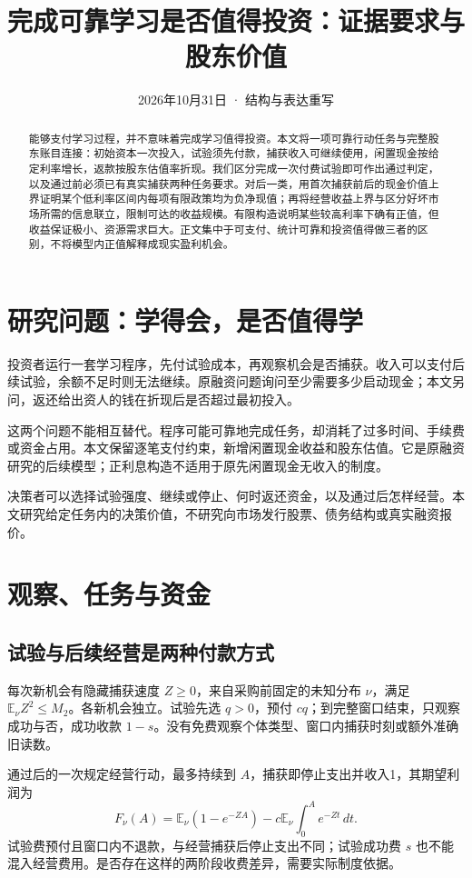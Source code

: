\documentclass[UTF8,fontset=windows,11pt,a4paper]{ctexart}
\numberwithin{equation}{section}
\begin{document}
\title{完成可靠学习是否值得投资：证据要求与股东价值}
\author{}\date{2026年10月31日 · 结构与表达重写}
\maketitle
\begin{abstract}
能够支付学习过程，并不意味着完成学习值得投资。本文将一项可靠行动任务与完整股东账目连接：初始资本一次投入，试验须先付款，捕获收入可继续使用，闲置现金按给定利率增长，返款按股东估值率折现。我们区分完成一次付费试验即可作出通过判定，以及通过前必须已有真实捕获两种任务要求。对后一类，用首次捕获前后的现金价值上界证明某个低利率区间内每项有限政策均为负净现值；再将经营收益上界与区分好坏市场所需的信息联立，限制可达的收益规模。有限构造说明某些较高利率下确有正值，但收益保证极小、资源需求巨大。正文集中于可支付、统计可靠和投资值得做三者的区别，不将模型内正值解释成现实盈利机会。
\end{abstract}

\section{研究问题：学得会，是否值得学}
投资者运行一套学习程序，先付试验成本，再观察机会是否捕获。收入可以支付后续试验，余额不足时则无法继续。原融资问题询问至少需要多少启动现金；本文另问，返还给出资人的钱在折现后是否超过最初投入。

这两个问题不能相互替代。程序可能可靠地完成任务，却消耗了过多时间、手续费或资金占用。本文保留逐笔支付约束，新增闲置现金收益和股东估值。它是原融资研究的后续模型；正利息构造不适用于原先闲置现金无收入的制度。

决策者可以选择试验强度、继续或停止、何时返还资金，以及通过后怎样经营。本文研究给定任务内的决策价值，不研究向市场发行股票、债务结构或真实融资报价。

\section{观察、任务与资金}
\subsection{试验与后续经营是两种付款方式}
每次新机会有隐藏捕获速度 $Z\ge0$，来自采购前固定的未知分布 $\nu$，满足 $\mathbb E_\nu Z^2\le M_2$。各新机会独立。试验先选 $q>0$，预付 $cq$；到完整窗口结束，只观察成功与否，成功收款 $1-s$。没有免费观察个体类型、窗口内捕获时刻或额外准确旧读数。

通过后的一次规定经营行动，最多持续到 $A$，捕获即停止支出并收入1，其期望利润为
\begin{equation}
 F_\nu(A)=\mathbb E_\nu(1-e^{-ZA})
 -c\mathbb E_\nu\int_0^A e^{-Zt}\,dt.
\end{equation}
试验费预付且窗口内不退款，与经营捕获后停止支出不同；试验成功费 $s$ 也不能混入经营费用。是否存在这样的两阶段收费差异，需要实际制度依据。
\end{document}
